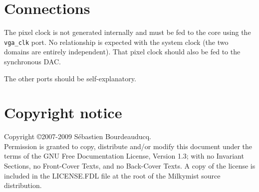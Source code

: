 \documentclass[a4paper,11pt]{article}
\begin{document}
\section{Connections}
The pixel clock is not generated internally and must be fed to the core using the \verb!vga_clk! port. No relationship is expected with the system clock (the two domains are entirely independent). That pixel clock should also be fed to the synchronous DAC.

The other ports should be self-explanatory.

\section*{Copyright notice}
Copyright \copyright 2007-2009 S\'ebastien Bourdeauducq. \\
Permission is granted to copy, distribute and/or modify this document under the terms of the GNU Free Documentation License, Version 1.3; with no Invariant Sections, no Front-Cover Texts, and no Back-Cover Texts. A copy of the license is included in the LICENSE.FDL file at the root of the Milkymist source distribution.
\end{document}
